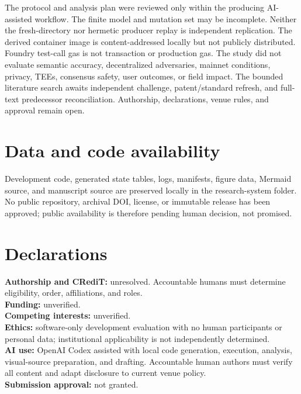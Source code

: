 \documentclass[10pt]{article}
\begin{document}
The protocol and analysis plan were reviewed only within the producing AI-assisted
workflow. The finite model and mutation set may be incomplete. Neither the
fresh-directory nor hermetic producer replay is independent replication. The derived
container image is content-addressed locally but not publicly distributed. Foundry
test-call gas is not transaction or
production gas. The study did not evaluate semantic accuracy, decentralized
adversaries, mainnet conditions, privacy, TEEs, consensus safety, user outcomes, or
field impact. The bounded literature search awaits independent challenge,
patent/standard refresh, and full-text predecessor reconciliation. Authorship,
declarations, venue rules, and approval remain open.

\section{Data and code availability}

Development code, generated state tables, logs, manifests, figure data, Mermaid
source, and manuscript source are preserved locally in the research-system folder.
No public repository, archival DOI, license, or immutable release has been approved;
public availability is therefore pending human decision, not promised.

\section*{Declarations}

\textbf{Authorship and CRediT:} unresolved. Accountable humans must determine
eligibility, order, affiliations, and roles.\\
\textbf{Funding:} unverified.\\
\textbf{Competing interests:} unverified.\\
\textbf{Ethics:} software-only development evaluation with no human participants or
personal data; institutional applicability is not independently determined.\\
\textbf{AI use:} OpenAI Codex assisted with local code generation, execution,
analysis, visual-source preparation, and drafting. Accountable human authors must
verify all content and adapt disclosure to current venue policy.\\
\textbf{Submission approval:} not granted.



\end{document}
